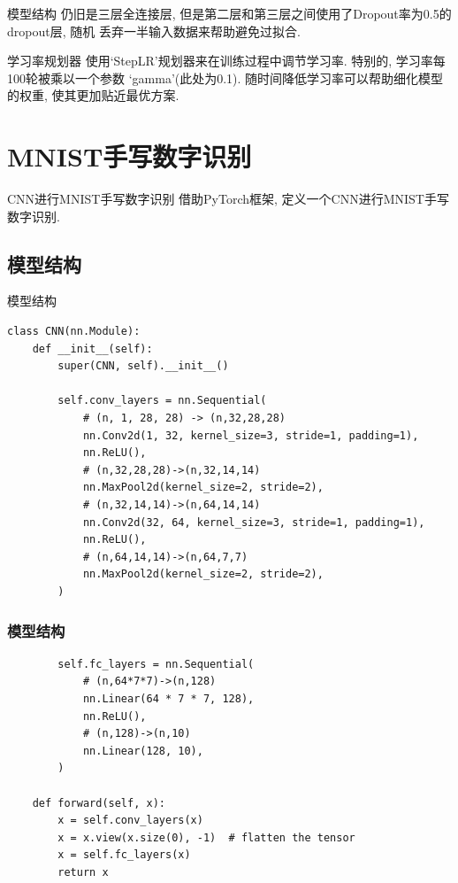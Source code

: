 \documentclass{beamer}
\begin{document}
\begin{frame}[fragile]{模型结构}
	仍旧是三层全连接层, 但是第二层和第三层之间使用了Dropout率为0.5的dropout层, 随机
	丢弃一半输入数据来帮助避免过拟合.

	\begin{block}{学习率规划器}
		使用`StepLR'规划器来在训练过程中调节学习率. 特别的, 学习率每100轮被乘以一个参数
		`gamma'(此处为0.1). 随时间降低学习率可以帮助细化模型的权重, 使其更加贴近最优方案.
	\end{block}
\end{frame}

\section{MNIST手写数字识别}
\begin{frame}[fragile]{CNN进行MNIST手写数字识别}
	借助PyTorch框架, 定义一个CNN进行MNIST手写数字识别.
\end{frame}

\subsection{模型结构}
\begin{frame}[fragile]{模型结构}
	\begin{verbatim}
class CNN(nn.Module):
    def __init__(self):
        super(CNN, self).__init__()

        self.conv_layers = nn.Sequential(
            # (n, 1, 28, 28) -> (n,32,28,28)
            nn.Conv2d(1, 32, kernel_size=3, stride=1, padding=1),
            nn.ReLU(),
            # (n,32,28,28)->(n,32,14,14)
            nn.MaxPool2d(kernel_size=2, stride=2),
            # (n,32,14,14)->(n,64,14,14)
            nn.Conv2d(32, 64, kernel_size=3, stride=1, padding=1),
            nn.ReLU(),
            # (n,64,14,14)->(n,64,7,7)
            nn.MaxPool2d(kernel_size=2, stride=2),
        )
	\end{verbatim}

\end{frame}
\begin{frame}[fragile]
	\frametitle{模型结构}

	\begin{verbatim}
        self.fc_layers = nn.Sequential(
            # (n,64*7*7)->(n,128)
            nn.Linear(64 * 7 * 7, 128),
            nn.ReLU(),
            # (n,128)->(n,10)
            nn.Linear(128, 10),
        )

    def forward(self, x):
        x = self.conv_layers(x)
        x = x.view(x.size(0), -1)  # flatten the tensor
        x = self.fc_layers(x)
        return x
	\end{verbatim}

\end{frame}
\end{document}
